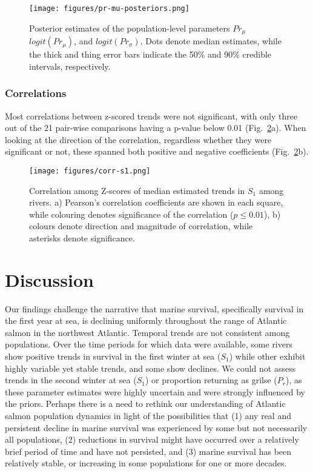 \documentclass[12pt]{article}
\newcommand{\So}{$S_{1}$\xspace}
\newcommand{\Pg}{$P_r$\xspace}
\begin{document}
\begin{figure}[htbp] \centering
    \texttt{[image: figures/pr-mu-posteriors.png]}
    \caption{Posterior estimates of the population-level parameters $Pr_{\mu}$
       $logit(Pr_{\mu})$, and $logit(Pr_{\sigma})$. Dots denote median estimates, while the thick and thing error bars indicate
       the 50\% and 90\% credible intervals, respectively.} 
   \label{fig:prmu-post} 
\end{figure}

\subsubsection*{Correlations}

Most correlations between z-scored trends were not significant, with only 
three out of the 21 pair-wise comparisons having a p-value below 0.01 (Fig.~\ref{fig:s1-corr}a).
When looking at the direction of the correlation, regardless whether they were
significant or not, these spanned both positive and negative coefficients
(Fig.~\ref{fig:s1-corr}b).

\begin{figure}[htbp] \centering
    \texttt{[image: figures/corr-s1.png]} \caption{
        Correlation among Z-scores of median estimated trends in \So among
        rivers. a) Pearson's correlation coefficients are shown in each square,
        while colouring denotes significance of the correlation ($p \leq 0.01$), b)
        colours denote direction and magnitude of correlation, while asterisks denote significance.}
\label{fig:s1-corr} 
\end{figure}

\section*{Discussion} 


Our findings challenge the narrative that marine survival, specifically survival in the first year at sea, is declining
uniformly throughout the range of Atlantic salmon in the northwest Atlantic.
Temporal trends are not consistent among populations. 
Over the time periods for which data were available, some rivers show positive trends in survival in the
first winter at sea (\So) while other exhibit highly variable yet stable trends, and some show
declines. We could not assess trends in the second winter at sea (\So) or
proportion returning as grilse (\Pg), as these parameter estimates were highly
uncertain and were strongly influenced by the priors.
Perhaps there is a need to rethink our understanding of Atlantic salmon
population dynamics in light of the possibilities that (1) any real and persistent decline in marine survival was
experienced by some but not necessarily all populations, (2) reductions in survival might
have occurred over a relatively brief period of time and have not persisted, and (3) marine survival has
been relatively stable, or increasing in some populations for one or more decades.
\end{document}
